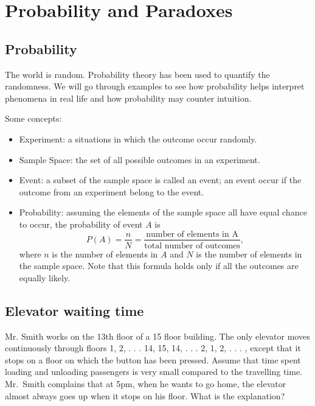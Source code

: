 \hypertarget{ch:probability}{%
\chapter{Probability and Paradoxes}\label{ch:probability}}

\hypertarget{probability}{%
\section{Probability}\label{probability}}

The world is random. Probability theory has been used to quantify the
randomness. We will go through examples to see how probability helps
interpret phenomena in real life and how probability may counter
intuition.

Some concepts:
\begin{itemize}
\item Experiment: a situations in which the outcome occur randomly.
\item Sample Space: the set of all possible outcomes in an experiment.
\item Event: a subset of the sample space is called an event; an event
  occur if the outcome from an experiment belong to the event.
\item Probability: assuming the elements of the sample space all have
  equal chance to occur, the probability of event $A$ is\\
  \begin{equation*}
    P(A)=\frac{n}{N}
    =\frac{\text{number of elements in A}}{\text{total number of outcomes}},
  \end{equation*}
  where \(n\) is the number of elements in \(A\) and \(N\) is the
  number of elements in the sample space.  Note that this formula
  holds only if all the outcomes are equally likely.
\end{itemize}

\hypertarget{example-elevator-waiting-time}{%
  \section{Elevator waiting
    time}\label{example-elevator-waiting-time}}
\begin{example}
  Mr. Smith works on the 13th floor of a 15 floor building. The only elevator
  moves continuously through floors 1, 2, . . . 14, 15, 14, . . . 2, 1, 2,
  . . . , except that it stops on a floor on which the button has been
  pressed. Assume that time spent loading and unloading passengers is very small
  compared to the travelling time.  Mr.~Smith complains that at 5pm, when he
  wants to go home, the elevator almost always goes up when it stops on his
  floor. What is the explanation?
\end{example}

